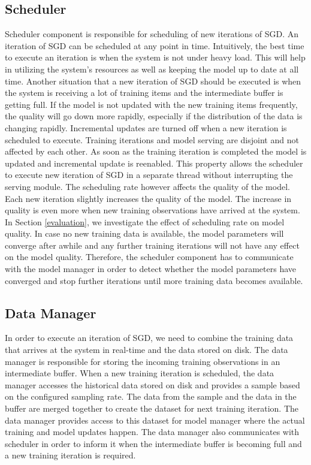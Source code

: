 \documentclass{vldb}
\begin{document}
\subsection{Scheduler}\label{scheduler}
Scheduler component is responsible for scheduling of new iterations of SGD.
An iteration of SGD can be scheduled at any point in time.
Intuitively, the best time to execute an iteration is when the system is not under heavy load.
This will help in utilizing the system's resources as well as keeping the model up to date at all time.
Another situation that a new iteration of SGD should be executed is when the system is receiving a lot of training items and the intermediate buffer is getting full.
If the model is not updated with the new training items frequently, the quality will go down more rapidly, especially if the distribution of the data is changing rapidly.
Incremental updates are turned off when a new iteration is scheduled to execute.
Training iterations and model serving are disjoint and not affected by each other.
As soon as the training iteration is completed the model is updated and incremental update is reenabled.
This property allows the scheduler to execute new iteration of SGD in a separate thread without interrupting the serving module.
The scheduling rate however affects the quality of the model.
Each new iteration slightly increases the quality of the model.
The increase in quality is even more when new training observations have arrived at the system.
In Section \ref{evaluation}, we investigate the effect of scheduling rate on model quality.
In case no new training data is available, the model parameters will converge after awhile and any further training iterations will not have any effect on the model quality.
Therefore, the scheduler component has to communicate with the model manager in order to detect whether the model parameters have converged and stop further iterations until more training data becomes available.

\subsection{Data Manager} \label{data-manager}
In order to execute an iteration of SGD, we need to combine the training data that arrives at the system in real-time and the data stored on disk.
The data manager is responsible for storing the incoming training observations in an intermediate buffer.
When a new training iteration is scheduled, the data manager accesses the historical data stored on disk and provides a sample based on the configured sampling rate.
The data from the sample and the data in the buffer are merged together to create the dataset for next training iteration.
The data manager provides access to this dataset for model manager where the actual training and model updates happen.
The data manager also communicates with scheduler in order to inform it when the intermediate buffer is becoming full and a new training iteration is required. 
\end{document}
